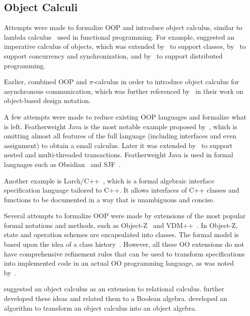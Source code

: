 
\subsection{Object Calculi}

Attempts were made to formalize OOP and introduce object calculus, similar to lambda calculus~\citep{barendregt2012} used in functional programming.
For example, \citet{abadi1995imperative} suggested an imperative calculus of objects, which was extended by~\citet{bono1998imperative} to support classes, by~\citet{gordon1998concurrent} to support concurrency and synchronization, and by~\citet{jeffrey1999distributed} to support distributed programming.

Earlier, \citet{honda1991object} combined OOP and \(\pi\)-calculus in order to introduce object calculus for asynchronous communication, which was further referenced by~\citet{jones1993pi} in their work on object-based design notation.

A few attempts were made to reduce existing OOP languages and formalize what is left.
Featherweight Java is the most notable example proposed by~\citet{igarashi2001featherweight}, which is omitting almost all features of the full language (including interfaces and even assignment) to obtain a small calculus.
Later it was extended by~\citet{jagannathan2005transactional} to support nested and multi-threaded transactions.
Featherweight Java is used in formal languages such as Obsidian~\citep{coblenz2019} and SJF~\citep{usov2020}.

Another example is Larch/C++~\citep{cheon1994quick}, which is a formal algebraic interface specification language tailored to C++.
It allows interfaces of C++ classes and functions to be documented in a way that is unambiguous and concise.

Several attempts to formalize OOP were made by extensions of the most popular formal notations and methods, such as Object-Z~\citep{duke1991object} and VDM++~\citep{durr1992vdm}.
In Object-Z, state and operation schemes are encapsulated into classes.
The formal model is based upon the idea of a class history~\citep{duke1990towards}.
However, all these OO extensions do not have comprehensive refinement rules that can be used to transform specifications into implemented code in an actual OO programming language, as was noted by~\citet{paige1999object}.

\citet{bancilhon1985calculus} suggested an object calculus as an extension to relational calculus.
\citet{jankowska2003anotheroop} further developed these ideas and related them to a Boolean algebra.
\citet{leekwakryu1996transform} developed an algorithm to transform an object calculus into an object algebra.

